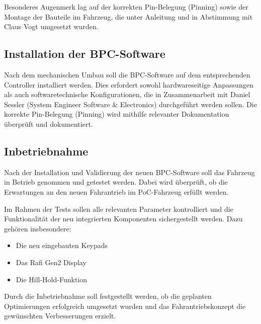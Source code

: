 \documentclass[a4paper, 12pt]{article} %
\begin{document}
\begin{spacing}{1.5}
 Besonderes Augenmerk lag auf der korrekten Pin-Belegung (Pinning) sowie der Montage der Bauteile im Fahrzeug, 
 die unter Anleitung und in Abstimmung mit Claus Vogt umgesetzt wurden.

 \subsection{Installation der BPC-Software}
 Nach dem mechanischen Umbau soll die \acs{BPC}-Software auf dem entsprechenden Controller installiert werden. 
 Dies erfordert sowohl hardwareseitige Anpassungen als auch softwaretechnische Konfigurationen, die in Zusammenarbeit mit Daniel 
Sessler (System Engineer Software \& Electronics) durchgeführt werden sollen. Die korrekte Pin-Belegung (Pinning) wird mithilfe relevanter Dokumentation überprüft und dokumentiert.
 

 \subsection{Inbetriebnahme}
 Nach der Installation und Validierung der neuen \acs{BPC}-Software soll das Fahrzeug in Betrieb genommen und getestet werden. Dabei wird überprüft, 
 ob die Erwartungen an den neuen Fahrantrieb im \acs{PoC}-Fahrzeug erfüllt werden.
 
 Im Rahmen der Tests sollen alle relevanten Parameter kontrolliert und 
 die Funktionalität der neu integrierten Komponenten sichergestellt werden. Dazu gehören insbesondere:
 
 \begin{itemize}
     \item Die neu eingebauten Keypads
     \item Das Rafi Gen2 Display
     \item Die Hill-Hold-Funktion
 \end{itemize}
 
 Durch die Inbetriebnahme soll festgestellt werden, 
 ob die geplanten Optimierungen erfolgreich umgesetzt wurden und das Fahrantriebskonzept 
 die gewünschten Verbesserungen erzielt.
 
\end{spacing}
\end{document}
